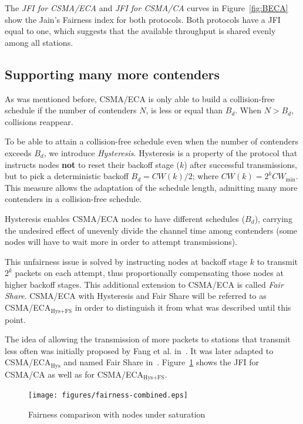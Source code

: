 \documentclass[a4paper,journal]{IEEEtran}
\begin{document}
The \emph{JFI for CSMA/ECA} and \emph{JFI for CSMA/CA} curves in Figure~\ref{fig:BECA} show the Jain's Fairness index for both protocols. Both protocols have a JFI equal to one, which suggests that the available throughput is shared evenly among all stations.

	\subsection{Supporting many more contenders}\label{moreContenders}
	As was mentioned before, CSMA/ECA is only able to build a collision-free schedule if the number of contenders $N$, is less or equal than $B_{d}$. When $N > B_{d}$, collisions reappear. 
	
	To be able to attain a collision-free schedule even when the number of contenders exceeds $B_{d}$, we introduce \emph{Hysteresis}. Hysteresis is a property of the protocol that instructs nodes {\bfseries not} to reset their backoff stage ($k$) after successful transmissions, but to pick a deterministic backoff $B_{d}=CW(k)/2$; where $CW(k)=2^{k}CW_{\min}$. This measure allows the adaptation of the schedule length, admitting many more contenders in a collision-free schedule.
	
	Hysteresis enables CSMA/ECA nodes to have different schedules ($B_{d}$), carrying the undesired effect of unevenly divide the channel time among contenders (some nodes will have to wait more in order to attempt transmissions).
	
	This unfairness issue is solved by instructing nodes at backoff stage $k$ to transmit $2^{k}$ packets on each attempt, thus proportionally compensating those nodes at higher backoff stages. This additional extension to CSMA/ECA is called \emph{Fair Share}. CSMA/ECA with Hysteresis and Fair Share will be referred to as CSMA/ECA$_{\text{Hys+FS}}$ in order to distinguish it from what was described until this point.
	
	The idea of allowing the transmission of more packets to stations that transmit less often was initially proposed by Fang et al. in~\cite{L_MAC}. It was later adapted to CSMA/ECA$_{\text{Hys}}$ and named Fair Share in~\cite{research2standards}. Figure~\ref{fig:fairness} shows the JFI for CSMA/CA as well as for CSMA/ECA$_{\text{Hys+FS}}$.
	
	\begin{figure}[tb]
	\centering
		\texttt{[image: figures/fairness-combined.eps]}
		\caption{Fairness comparison with nodes under saturation}
		\label{fig:fairness}
	\end{figure}
	
\end{document}
